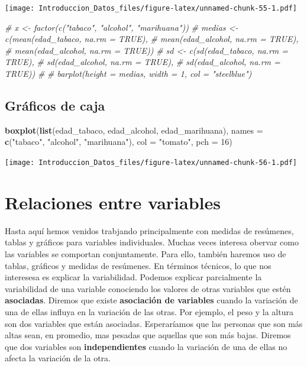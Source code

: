 \documentclass[spanish,]{book}
\newenvironment{Shaded}{\begin{snugshade}}{\end{snugshade}}
\newcommand{\KeywordTok}[1]{\textcolor[rgb]{0.13,0.29,0.53}{\textbf{#1}}}
\newcommand{\DataTypeTok}[1]{\textcolor[rgb]{0.13,0.29,0.53}{#1}}
\newcommand{\DecValTok}[1]{\textcolor[rgb]{0.00,0.00,0.81}{#1}}
\newcommand{\StringTok}[1]{\textcolor[rgb]{0.31,0.60,0.02}{#1}}
\newcommand{\CommentTok}[1]{\textcolor[rgb]{0.56,0.35,0.01}{\textit{#1}}}
\newcommand{\NormalTok}[1]{#1}
\begin{document}
\texttt{[image: Introduccion\_Datos\_files/figure-latex/unnamed-chunk-55-1.pdf]}

\begin{Shaded}
\begin{Highlighting}[]
\CommentTok{# x <- factor(c("tabaco", "alcohol", "marihuana"))}
\CommentTok{# medias <- c(mean(edad_tabaco, na.rm = TRUE),}
\CommentTok{#             mean(edad_alcohol, na.rm = TRUE),}
\CommentTok{#             mean(edad_alcohol, na.rm = TRUE))}
\CommentTok{# sd <- c(sd(edad_tabaco, na.rm = TRUE),}
\CommentTok{#         sd(edad_alcohol, na.rm = TRUE),}
\CommentTok{#         sd(edad_alcohol, na.rm = TRUE))}
\CommentTok{# }
\CommentTok{# barplot(height = medias, width = 1, col = "steelblue")}
\end{Highlighting}
\end{Shaded}

\section{Gráficos de caja}\label{graficos-de-caja}

\begin{Shaded}
\begin{Highlighting}[]
\KeywordTok{boxplot}\NormalTok{(}\KeywordTok{list}\NormalTok{(edad_tabaco, edad_alcohol, edad_marihuana),}
        \DataTypeTok{names =} \KeywordTok{c}\NormalTok{(}\StringTok{"tabaco"}\NormalTok{, }\StringTok{"alcohol"}\NormalTok{, }\StringTok{"marihuana"}\NormalTok{),}
        \DataTypeTok{col =} \StringTok{"tomato"}\NormalTok{,}
        \DataTypeTok{pch =} \DecValTok{16}\NormalTok{)}
\end{Highlighting}
\end{Shaded}

\texttt{[image: Introduccion\_Datos\_files/figure-latex/unnamed-chunk-56-1.pdf]}

\chapter{Relaciones entre variables}\label{relaciones-entre-variables}

Hasta aquí hemos venidos trabjando principalmente con medidas de
resúmenes, tablas y gráficos para variables individuales. Muchas veces
interesa obervar como las variables se comportan conjuntamente. Para
ello, también haremos uso de tablas, gráficos y medidas de resúmenes. En
términos técnicos, lo que nos interesesa es explicar la variabilidad.
Podemos explicar parcialmente la variabilidad de una variable conociendo
los valores de otras variables que estén \textbf{asociadas}. Diremos que
existe \textbf{asociación de variables} cuando la variación de una de
ellas influya en la variación de las otras. Por ejemplo, el peso y la
altura son dos variables que están asociadas. Esperaríamos que las
personas que son más altas sean, en promedio, mas pesadas que aquellas
que son más bajas. Diremos que dos variables son \textbf{independientes}
cuando la variación de una de ellas no afecta la variación de la otra.
\end{document}
